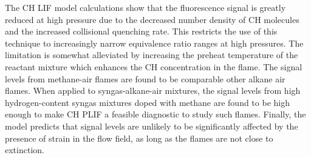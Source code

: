 The CH LIF model calculations show that the fluorescence signal is greatly reduced at high pressure due to the decreased number density of CH molecules and the increased collisional quenching rate.
This restricts the use of this technique to increasingly narrow equivalence ratio ranges at high pressures.
The limitation is somewhat alleviated by increasing the preheat temperature of the reactant mixture which enhances the CH concentration in the flame.
The signal levels from methane-air flames are found to be comparable other alkane air flames.
When applied to syngas-alkane-air mixtures, the signal levels from high hydrogen-content syngas mixtures doped with methane are found to be high enough to make CH PLIF a feasible diagnostic to study such flames.
Finally, the model predicts that signal levels are unlikely to be significantly affected by the presence of strain in the flow field, as long as the flames are not close to extinction.

